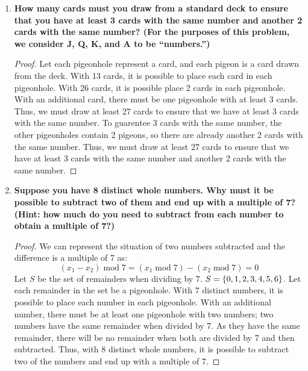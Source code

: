 \documentclass[article, 12pt]{article}
\theoremstyle{definition}
\newcommand{\Mod}[1]{\;\mathrm{mod}\; #1} %
\DeclarePairedDelimiter\set{\{}{\}}
\begin{document}
\begin{enumerate}[(1)]
\begin{proof}
        If each child brings back the least amount of eggs possible, then child 1 brings back 0 eggs, child 2 brings back 1 egg, child 3 brings back 2 eggs, and so on:
        \[ 0,1,2,3, \dots, 14\]
        The total eggs brought back is:
        \[ \sum_{i=0}^{14} i = 105 \smashtimes \]
        We arrive at a contradiction, as the total eggs brought back is 105, which exceeds the 100 eggs that were brought back. Had the children brought back more eggs, the the total would have also exceeded 100. Thus, $p \to q$ is true, meaning that, if 15 children brought back a total of 100 eggs, then 2 of them must bring back the same number of eggs.
    \end{proof}
    \item \textbf{How many cards must you draw from a standard deck to ensure that you have at least 3 cards with the same number and another 2 cards with the same number? (For the purposes of this problem, we consider J, Q, K, and A to be “numbers.”)}
    \begin{proof}
        Let each pigeonhole represent a card, and each pigeon is a card drawn from the deck. With 13 cards, it is possible to place each card in each pigeonhole. With 26 cards, it is possible place 2 cards in each pigeonhole. With an additional card, there must be one pigeonhole with at least 3 cards. Thus, we must draw at least 27 cards to ensure that we have at least 3 cards with the same number. To guarentee 3 cards with the same number, the other pigeonholes contain 2 pigeons, so there are already another 2 cards with the same number. Thus, we must draw at least 27 cards to ensure that we have at least 3 cards with the same number and another 2 cards with the same number.
    \end{proof}
    \item \textbf{Suppose you have 8 distinct whole numbers. Why must it be possible to subtract two of them and end up with a multiple of 7? (Hint: how much do you need to subtract from each number to obtain a multiple of 7?)}
    \begin{proof}
        We can represent the situation of two numbers subtracted and the difference is a multiple of 7 as:
        \begin{equation*}
            (x_1 - x_2)\Mod{7} = (x_1\Mod{7}) - (x_2\Mod{7}) = 0
        \end{equation*}
        Let $S$ be the set of remainders when dividing by 7. $S = \set*{0,1,2,3,4,5,6}$. Let each remainder in the set be a pigeonhole. With 7 distinct numbers, it is possible to place each number in each pigeonhole. With an additional number, there must be at least one pigeonhole with two numbers; two numbers have the same remainder when divided by 7. As they have the same remainder, there will be no remainder when both are divided by 7 and then subtracted. Thus, with 8 distinct whole numbers, it is possible to subtract two of the numbers and end up with a multiple of 7.

\end{proof}
\end{enumerate}
\end{document}
